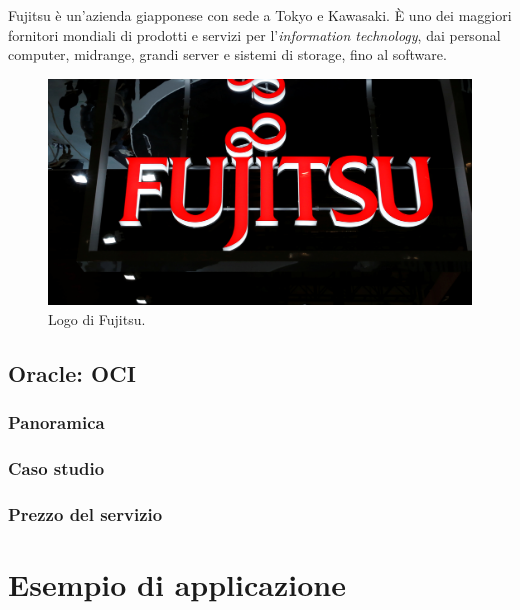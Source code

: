 \documentclass[a4paper]{article}
\begin{document}
	\noindent
	Fujitsu è un'azienda giapponese con sede a Tokyo e Kawasaki. È uno dei maggiori fornitori mondiali di prodotti e servizi per l'\emph{information technology}, dai personal computer, midrange, grandi server e sistemi di storage, fino al software.
	\begin{figure}[!htp]
		\centering
		\includegraphics[width=\textwidth]{img/Fujitsu-1.jpg}
		\caption{Logo di Fujitsu.}
	\end{figure}
	
	\subsection{Oracle: OCI}
	
	\subsubsection{Panoramica}
	
	\subsubsection{Caso studio}
	
	\subsubsection{Prezzo del servizio}
	
	\section{Esempio di applicazione}	
\end{document}
